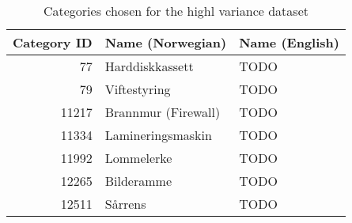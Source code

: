 \begin{table}[h]
\centering
\caption{Categories chosen for the highl variance dataset}
\label{table:dataset-high_variance_categories}
\begin{tabular}{rll}
\toprule
 Category ID &    Name (Norwegian) & Name (English) \\
\midrule
          77 &     Harddiskkassett &           TODO \\
          79 &        Viftestyring &           TODO \\
       11217 & Brannmur (Firewall) &           TODO \\
       11334 &   Lamineringsmaskin &           TODO \\
       11992 &          Lommelerke &           TODO \\
       12265 &          Bilderamme &           TODO \\
       12511 &             Sårrens &           TODO \\
\bottomrule
\end{tabular}
\end{table}
